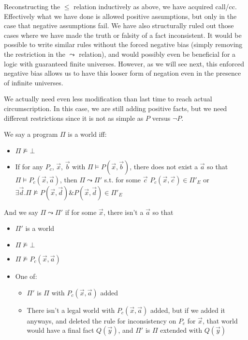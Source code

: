 Reconstructing the $\leq$ relation inductively as above, we have acquired call/cc.
Effectively what we have done is allowed positive assumptions, but only in the case that negative assumptions fail.
We have also structurally ruled out those cases where we have made the truth or falsity of a fact inconsistent.
It would be possible to write similar rules without the forced negative bias (simply removing the restriction in the $\leadsto$ relation), and would possibly even be beneficial for a logic with guaranteed finite universes.
However, as we will see next, this enforced negative bias allows us to have this looser form of negation even in the presence of infinite universes.

We actually need even less modification than last time to reach actual circumscription.
In this case, we are still adding positive facts, but we need different restrictions since it is not as simple as $P$ versus $\neg P$.

We say a program $\Pi$ is a world iff:
\begin{itemize}
	\item $\Pi \not \models \bot$
	\item If for any $P_c$, $\vec{x}$, $\vec{b}$ with $\Pi \models P(\vec{x}, \vec{b})$, there does not exist a $\vec{a}$ so that $\Pi \models P_c(\vec{x}, \vec{a})$, then $\Pi \leadsto \Pi'$ s.t. for some $\vec{c}$ $P_c(\vec{x}, \vec{c}) \in \Pi'_E$ or $\exists \vec{d}. \Pi \not \models P(\vec{x}, \vec{d}) \& P(\vec{x}, \vec{d}) \in \Pi'_E$
\end{itemize}

And we say $\Pi \leadsto \Pi'$ if for some $\vec{x}$, there isn't a $\vec{a}$ so that
\begin{itemize}
	\item $\Pi'$ is a world
	\item $\Pi \not \models \bot$
	\item $\Pi \not \models P_c(\vec{x}, \vec{a})$
	\item One of:
	\begin{itemize}
		\item $\Pi'$ is $\Pi$ with $P_c(\vec{x}, \vec{a})$ added
		\item There isn't a legal world with $P_c(\vec{x}, \vec{a})$ added, but if we added it anyways, and deleted the rule for inconsistency on $P_c$ for $\vec{x}$, that world would have a final fact $Q(\vec{y})$, and $\Pi'$ is $\Pi$ extended with $Q(\vec{y})$
	\end{itemize}
\end{itemize}


